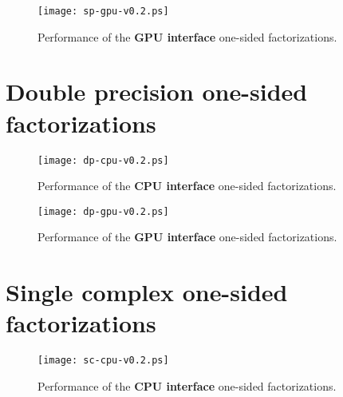 \documentclass[10pt]{book}
\begin{document}
       \begin{figure}[!ht]
          \centering
          \hspace{-5mm}
          \texttt{[image: sp-gpu-v0.2.ps]}
          \caption{Performance of the {\bf GPU interface}
                   one-sided factorizations.}
       \label{sp-gpu-performance}
       \end{figure}
\newpage
\section{Double precision one-sided factorizations}
       \begin{figure}[!ht]
          \centering
          \hspace{-5mm}
          \texttt{[image: dp-cpu-v0.2.ps]}
          \caption{Performance of the {\bf CPU interface} 
                   one-sided factorizations.}
       \label{dp-cpu-performance}
       \end{figure}

       \begin{figure}[!ht]
          \centering
          \hspace{-5mm}
          \texttt{[image: dp-gpu-v0.2.ps]}
          \caption{Performance of the {\bf GPU interface} 
                   one-sided factorizations.}
       \label{dp-gpu-performance}
       \end{figure}

\newpage
\section{Single complex one-sided factorizations}
       \begin{figure}[!ht]
          \centering
          \hspace{-5mm}
          \texttt{[image: sc-cpu-v0.2.ps]}
          \caption{Performance of the {\bf CPU interface} 
                   one-sided factorizations.}
       \label{sp-cpu-performance}
       \end{figure}
\end{document}

